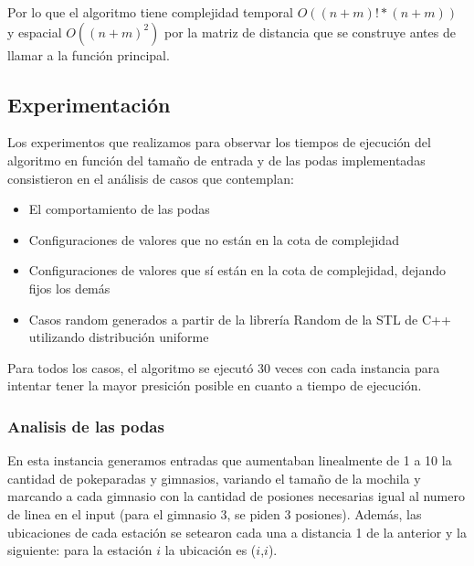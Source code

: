       Por lo que el algoritmo tiene complejidad temporal $O((n+m)! * (n+m))$ y espacial $O((n+m)^2)$ por la matriz de distancia que se construye antes de llamar a la función principal.


    \subsection{Experimentación}

      Los experimentos que realizamos para observar los tiempos de ejecución del algoritmo en función del tamaño de entrada y de las podas implementadas consistieron en el análisis de casos que contemplan:

      \begin{itemize}
        \item El comportamiento de las podas
        \item Configuraciones de valores que no están en la cota de complejidad
        \item Configuraciones de valores que sí están en la cota de complejidad, dejando fijos los demás
        \item Casos random generados a partir de la librería Random de la STL de C++ utilizando distribución uniforme
      \end{itemize}

      Para todos los casos, el algoritmo se ejecutó 30 veces con cada instancia para intentar tener la mayor presición posible en cuanto a tiempo de ejecución.

      \subsubsection{Analisis de las podas}
      En esta instancia generamos entradas que aumentaban linealmente de 1 a 10 la cantidad de pokeparadas y gimnasios, variando el tamaño de la mochila y marcando a cada gimnasio con la cantidad de posiones necesarias igual al numero de linea en el input (para el gimnasio 3, se piden 3 posiones). Además, las ubicaciones de cada estación se setearon cada una a distancia 1 de la anterior y la siguiente: para la estación $i$ la ubicación es ($i$,$i$).

